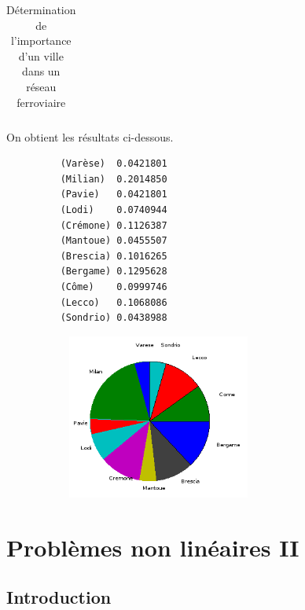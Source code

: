 \documentclass[a4paper,10pt]{report}
\begin{document}
\begin{table}[H]
\caption{Détermination de l'importance d'un ville dans un réseau ferroviaire}
\begin{tabular}{l}

\label{italie}
\end{tabular}
\end{table}

\newpage
On obtient les résultats ci-dessous.
\begin{figure}[H]
\begin{minipage}[c]{.40\linewidth}
\begin{verbatim}
    (Varèse)  0.0421801  
    (Milian)  0.2014850  
    (Pavie)   0.0421801  
    (Lodi)    0.0740944  
    (Crémone) 0.1126387  
    (Mantoue) 0.0455507  
    (Brescia) 0.1016265  
    (Bergame) 0.1295628  
    (Côme)    0.0999746  
    (Lecco)   0.1068086  
    (Sondrio) 0.0438988 
\end{verbatim}
\end{minipage} \hfill
\begin{minipage}[c]{.58\linewidth}
\begin{figure}[H]
   \includegraphics[width=6cm]{diag_italiennes.png}
   \end{figure}
\end{minipage}
\end{figure}

\chapter{Problèmes non linéaires II}
\section{Introduction}

\newpage
\end{document}
